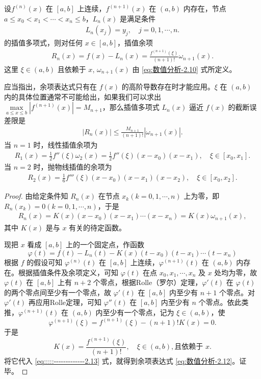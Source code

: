\documentclass[../../main.tex]{subfiles}%
\begin{document}
\begin{theorem}\label{theorem:Lagrange插值多项式的Lagrange插值余项}
设$f^{(n)}(x)$ 在 $[a, b]$ 上连续，$f^{(n + 1)}(x)$ 在 $(a, b)$ 内存在，节点 $a \leqslant x_0 < x_1 < \cdots < x_n \leqslant b$，$L_n(x)$ 是满足条件 
\begin{align*}
L_n(x_j) = y_j, \quad j = 0, 1, \cdots, n.
\end{align*}
的插值多项式，则对任何 $x \in [a, b]$，插值余项 
\begin{align}
R_n(x) = f(x) - L_n(x) = \frac{f^{(n + 1)}(\xi)}{(n + 1)!} \omega_{n + 1}(x). \label{eq:数值分析-2.12}
\end{align}
这里 $\xi \in (a, b)$ 且依赖于 $x$,$\,\,\omega_{n + 1}(x)$ 由 \eqref{eq:数值分析-2.10} 式所定义。
\end{theorem}
\begin{remark}
应当指出，余项表达式只有在 $f(x)$ 的高阶导数存在时才能应用。$\xi$ 在 $(a, b)$ 内的具体位置通常不可能给出，如果我们可以求出 $\max\limits_{a \leqslant x \leqslant b} | f^{(n + 1)}(x) | = M_{n + 1}$，那么插值多项式 $L_n(x)$ 逼近 $f(x)$ 的截断误差限是
\begin{align}
| R_n(x) | \leqslant \frac{M_{n + 1}}{(n + 1)!} | \omega_{n + 1}(x) | .\label{eq:数值分析-2.14}
\end{align}
当 $n = 1$ 时，线性插值余项为 
\begin{align}
R_1(x) = \frac{1}{2} f''(\xi) \omega_2(x) = \frac{1}{2} f''(\xi)(x - x_0)(x - x_1), \quad \xi \in [x_0, x_1] .\label{eq:数值分析-2.15}
\end{align}
当 $n = 2$ 时，抛物线插值的余项为 
\begin{align}
R_2(x) = \frac{1}{6} f'''(\xi)(x - x_0)(x - x_1)(x - x_2), \quad \xi \in [x_0, x_2].\label{eq:数值分析-2.16}
\end{align}
\end{remark}
\begin{proof}
由给定条件知 $R_n(x)$ 在节点 $x_k (k = 0, 1, \cdots, n)$ 上为零，即 $R_n(x_k) = 0 (k = 0, 1, \cdots, n)$，于是 
\begin{align}
R_n(x) = K(x)(x - x_0)(x - x_1) \cdots (x - x_n) = K(x) \omega_{n + 1}(x),\label{eq:::::-------------2.13}
\end{align}
其中 $K(x)$ 是与 $x$ 有关的待定函数。

现把 $x$ 看成 $[a, b]$ 上的一个固定点，作函数 
\[
\varphi(t) = f(t) - L_n(t) - K(x)(t - x_0)(t - x_1) \cdots (t - x_n)
\]
根据 $f$ 的假设可知 $\varphi^{(n)}(t)$ 在 $[a, b]$ 上连续，$\varphi^{(n + 1)}(t)$ 在 $(a, b)$ 内存在。根据插值条件及余项定义，可知 $\varphi(t)$ 在点 $x_0, x_1, \cdots, x_n$ 及 $x$ 处均为零，故 $\varphi(t)$ 在 $[a, b]$ 上有 $n + 2$ 个零点，根据Rolle（罗尔）定理，$\varphi'(t)$ 在 $\varphi(t)$ 的两个零点间至少有一个零点，故 $\varphi'(t)$ 在 $[a, b]$ 内至少有 $n + 1$ 个零点。对 $\varphi'(t)$ 再应用Rolle定理，可知 $\varphi''(t)$ 在 $[a, b]$ 内至少有 $n$ 个零点。依此类推，$\varphi^{(n + 1)}(t)$ 在 $(a, b)$ 内至少有一个零点，记为 $\xi \in (a, b)$，使 
\[
\varphi^{(n + 1)}(\xi) = f^{(n + 1)}(\xi) - (n + 1)! K(x) = 0.
\]
于是 
\[
K(x) = \frac{f^{(n + 1)}(\xi)}{(n + 1)!}, \quad \xi \in (a, b), \text{且依赖于 } x.
\]
将它代入 \eqref{eq:::::-------------2.13} 式，就得到余项表达式 \eqref{eq:数值分析-2.12}。证毕。
\end{proof}
\end{document}
